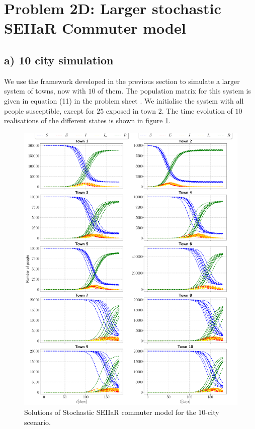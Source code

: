 \section{Problem 2D: Larger stochastic SEIIaR Commuter model}

\subsection{a) 10 city simulation}

We use the framework developed in the previous section to simulate a larger system of towns, now with $10$ of them. The population matrix for this system is given in equation (11) in the problem sheet \cite{sheet}. We initialise the system with all people susceptible, except for $25$ exposed in town $2$. The time evolution of $10$ realisations of the different states is shown in figure \ref{fig:commuter_10city}. 

\begin{figure}[htb]
	\centering
	\includegraphics[width=0.87\columnwidth]{../fig/2Ea_commuter.pdf}
	\caption{Solutions of Stochastic SEIIaR commuter model for the $10$-city scenario.}
	\label{fig:commuter_10city}
\end{figure}

